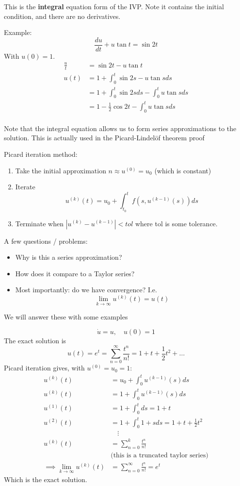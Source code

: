 \documentclass{/home/janmebows/Documents/LatexTemplates/myassignment}
\begin{document}
This is the \textbf{integral} equation form of the IVP. Note it contains the initial condition, and there are no derivatives.

Example:
\[\frac{du}{dt} + u\tan t = \sin 2t\]
With $u(0) = 1$.
\begin{align*}
    \frac{u}{t} &= \sin 2t - u\tan t\\
    u(t) &= 1 + \int_{0}^t \sin 2s - u\tan s ds\\
        &= 1 + \int_0^t \sin 2s ds - \int_0^t u\tan s ds\\
        &= 1 -\frac12 \cos 2t - \int_0^t u\tan s ds\\
\end{align*}

Note that the integral equation allows us to form series approximations to the solution. This is actually used in the Picard-Lindel\"of theorem proof


Picard iteration method:
\begin{enumerate}
    \item Take the initial approximation $n\approx u^{(0)} = u_0$ (which is constant)
    \item Iterate
    \[u^{(k)}(t) =u_0 + \int_{t_0}^t f(s,u^{(k-1)}(s))ds \]
    \item Terminate when $|u^{(k)} - u^{(k-1)}| < tol $ where tol is some tolerance.
\end{enumerate}

A few questions / problems:
\begin{itemize}
    \item Why is this a series approximation?
    \item How does it compare to a Taylor series?
    \item Most importantly: do we have convergence? I.e.
    \[\lim_{k\to\infty} u^{(k)}(t) = u(t)\]
\end{itemize}

We will answer these with some examples

\[\dot u = u, \quad u(0) = 1\]
The exact solution is 
\[u(t) = e^t = \sum_{n=0}^\infty \frac{t^n}{n!} = 1+ t +\frac12 t^2 + \hdots\]
Picard iteration gives, with $u^{(0)} = u_0 = 1$:
\begin{align*}
    u^{(k)}(t) &= u_0 + \int_0^t u^{(k-1)}(s) ds\\
    u^{(k)}(t) &= 1 + \int_0^t u^{(k-1)}(s) ds\\
    u^{(1)}(t) &= 1 + \int_0^t ds = 1 + t\\
    u^{(2)}(t) &= 1 + \int_0^t 1+s ds = 1 + t + \frac12 t^2\\
    &\quad \vdots\\
    u^{(k)}(t) &= \sum_{n=0}^k \frac{t^n}{n!}\\
    &\text{(this is a truncated taylor series)}\\
    \implies \lim_{k\to\infty} u^{(k)}(t) &= \sum_{n=0}^\infty \frac{t^n}{n!} = e^{t}
\end{align*}
Which is the exact solution.
\end{document}
